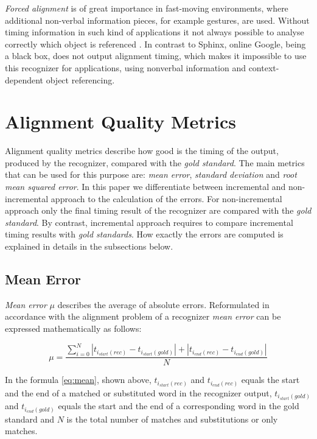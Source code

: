 \textit {Forced alignment} is of great importance in fast-moving environments,
where additional non-verbal information pieces, for example gestures, are used. 
Without timing information in such kind of applications it not always possible to
analyse correctly which object is referenced 
\parencite {Baumann2016}.  In contrast to Sphinx, online Google, being a black
box, does not output alignment timing, which makes it impossible to use this 
recognizer for applications, using nonverbal information and context-dependent
object referencing. 

\section {Alignment Quality Metrics}
Alignment quality metrics describe how good is the timing of the output,
produced by the recognizer, compared with the \textit {gold standard}. The main
metrics that can be used for this purpose are: \textit {mean error}, \textit {standard deviation} and \textit {root mean squared error}. In this paper we
differentiate between incremental and non-incremental approach to the
calculation of the errors.  For non-incremental approach only the
final timing result of the recognizer are compared with the \textit {gold
standard}. By contrast, incremental approach requires to compare incremental
timing results with \textit {gold standards}.  How exactly the errors are
computed is explained in details in the subsections below. 
\subsection {Mean Error} \textit {Mean error}  $\mu$ 
describes the average of absolute errors. Reformulated in accordance with
the alignment problem of a recognizer  \textit {mean error}   can be expressed
mathematically as follows:
\begin{center} 
\begin{equation} \mu=\frac{\sum_{i=0}^N
|t_{i_{start}(rec)}-t_{i_{start}(gold)}|+|t_{i_{end}(rec)}-t_{i_{end}(gold)}|}{N}
\label{eq:mean}
\end{equation}
\end{center} In the formula  \ref {eq:mean}, shown above, 
$t_{i_{start}(rec)}$ and $t_{i_{end}(rec)}$ equals the start and the end of a
matched or substituted word in the recognizer output,
$t_{i_{start}(gold)}$ and $t_{i_{end}(gold)}$ equals the start and the end of
a corresponding word in the gold standard and $N$ is the total number of matches
and substitutions or only matches.

